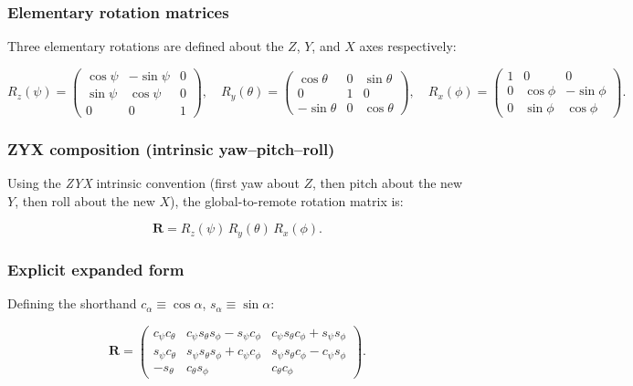 \documentclass[12pt, a4paper]{article}
\begin{document}
\subsubsection{Elementary rotation matrices}
Three elementary rotations are defined about the $Z$, $Y$, and $X$ axes
respectively:

\begin{equation}
R_z(\psi) =
\begin{pmatrix}
\cos\psi & -\sin\psi & 0 \\
\sin\psi &  \cos\psi & 0 \\
0        &  0        & 1
\end{pmatrix},
\quad
R_y(\theta) =
\begin{pmatrix}
 \cos\theta & 0 & \sin\theta \\
 0          & 1 & 0          \\
-\sin\theta & 0 & \cos\theta
\end{pmatrix},
\quad
R_x(\phi) =
\begin{pmatrix}
1 & 0       &  0      \\
0 & \cos\phi & -\sin\phi \\
0 & \sin\phi &  \cos\phi
\end{pmatrix}.
\end{equation}

\subsubsection{ZYX composition (intrinsic yaw–pitch–roll)}
Using the \emph{ZYX} intrinsic convention (first yaw about $Z$, then pitch
about the new $Y$, then roll about the new $X$), the global-to-remote
rotation matrix is:

\begin{equation}
\mathbf{R} = R_z(\psi)\,R_y(\theta)\,R_x(\phi).
\end{equation}

\subsubsection{Explicit expanded form}
Defining the shorthand $c_\alpha \equiv \cos\alpha$, $s_\alpha \equiv \sin\alpha$:

\begin{equation}
\mathbf{R} =
\begin{pmatrix}
c_\psi c_\theta &
  c_\psi s_\theta s_\phi - s_\psi c_\phi &
  c_\psi s_\theta c_\phi + s_\psi s_\phi \\[4pt]
s_\psi c_\theta &
  s_\psi s_\theta s_\phi + c_\psi c_\phi &
  s_\psi s_\theta c_\phi - c_\psi s_\phi \\[4pt]
-s_\theta &
  c_\theta s_\phi &
  c_\theta c_\phi
\end{pmatrix}.
\label{eq:R}
\end{equation}
\end{document}

